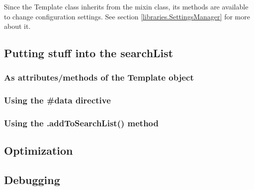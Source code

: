 Since the Template class inherits from the  mixin class,
its methods are available to change configuration settings.  See section
\ref{libraries.SettingsManager} for more about it.


\subsection{Putting stuff into the searchList}
\label{puttingItTogether.searchList}

\subsubsection{As attributes/methods of the Template object}
\label{puttingItTogether.searchList.self}

\subsubsection{Using the \#data directive}
\label{puttingItTogether.searchList.dataDirective}

\subsubsection{Using the .addToSearchList() method}
\label{puttingItTogether.searchList.addToSearchList}


\subsection{Optimization}
\label{puttingItTogether.optimization}

\subsection{Debugging}
\label{puttingItTogether.debugging}



